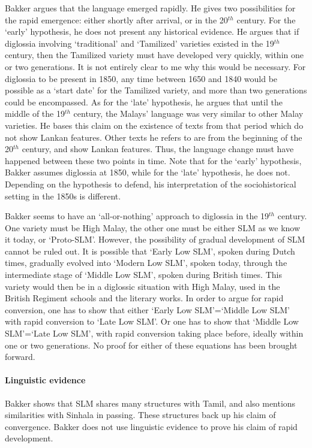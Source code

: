 Bakker argues that the language emerged rapidly. He gives two possibilities for the rapid emergence: either shortly after arrival, or in the 20$^{th}$ century. For the `early' hypothesis, he does not present any historical evidence. He argues that if  diglossia involving `traditional' and `Tamilized' varieties existed in the 19$^{th}$ century, then the Tamilized variety must have developed very quickly, within one or two generations. It is not entirely clear to me why this would be necessary. For diglossia to be present in 1850, any time between 1650 and 1840 would be possible as a `start date' for the Tamilized variety, and more than two generations could be encompassed. As for the `late' hypothesis, he argues that until the middle of the 19$^{th}$ century, the Malays' language was very similar to other Malay varieties. He bases this claim on the existence of texts from that period which do not show Lankan features. Other texts he refers to are from the beginning of the 20$^{th}$ century, and show Lankan features. Thus, the language change must  have happened between these two points in time. Note that for the `early' hypothesis, Bakker assumes diglossia at 1850, while for the `late' hypothesis, he does not. Depending on the hypothesis to defend, his interpretation of the sociohistorical setting in the 1850s is different.

Bakker seems to have an `all-or-nothing' approach to diglossia in the 19$^{th}$ century. One variety must be High Malay, the other one must be either SLM as we know it today, or `Proto-SLM'. However, the possibility of gradual development of SLM cannot be ruled out. It is possible that `Early Low SLM', spoken during Dutch times, gradually evolved into `Modern Low SLM', spoken today, through the intermediate stage of `Middle Low SLM', spoken during British times. This variety would then be in a diglossic situation with High Malay, used in the British Regiment schools and the literary works. In order to argue for rapid conversion, one has to show that either `Early Low SLM'=`Middle Low SLM' with rapid conversion to `Late Low SLM'. Or one has to show that `Middle Low SLM'=`Late Low SLM', with rapid conversion taking place before, ideally within one or two generations. No proof for either of these equations has been brought forward.

\paragraph{Linguistic evidence}
Bakker shows that SLM shares many structures with Tamil, and also mentions similarities with Sinhala in passing. These structures back up his claim of convergence. Bakker does not use linguistic evidence to prove his claim of rapid development.

